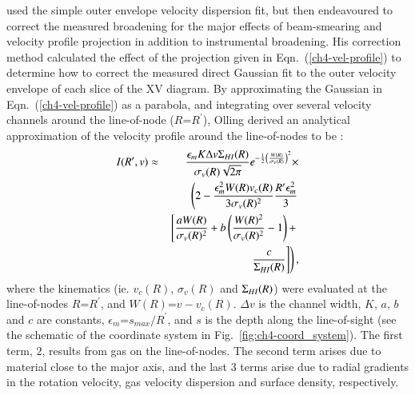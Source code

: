 \documentclass[traditabstract]{aa} %
\newcommand\HI{H{\small I}}
\begin{document}
\citet{olling1996a} used the simple outer envelope velocity dispersion
fit, but then endeavoured to correct the measured broadening for the
major effects of beam-smearing and velocity profile projection in
addition to instrumental broadening. His correction method
\citep[detailed in Appendix A of ][]{olling1996a} calculated the
effect of the projection given in Eqn.~(\ref{ch4-vel-profile}) to
determine how to correct the measured direct Gaussian fit to the outer
velocity envelope of each slice of the XV diagram. By approximating the
Gaussian in Eqn.~(\ref{ch4-vel-profile}) as a parabola, and integrating
over several velocity channels around the line-of-node
($R$=$R^{\prime}$), Olling derived an analytical approximation of the
velocity profile around the line-of-nodes to be \citep[Eqn.~(A5) of
][]{olling1996a}:
\begin{eqnarray}
\label{eq:ch4-olling-approx}
  I(R^{\prime},v) &\approx & \frac{\epsilon_m K \Delta v
      \Sigma_{\HI}(R)}{\sigma_v(R) \sqrt{2 \pi}}  e^{-
    \frac{1}{2} \left(
      \frac{W(R)}{\sigma_v(R)} \right)^2} \times \nonumber \\
 & & \left( 2 - \frac{\epsilon_m^2 W(R) v_c(R)}{3
        \sigma_v(R)^2}
    \frac{R^{\prime} \epsilon_m^2}{3} \right. \nonumber \\
 & & \left. \left[ \frac{a
          W(R)}{\sigma_v(R)^2} 
        + b \left( \frac{W(R)^2}{\sigma_v(R)^2} - 1 \right) +
\right. \right. \nonumber \\
 & & \left. \left. 
      \frac{c}{\Sigma_{\HI}(R)} \right] \right),
\end{eqnarray}
where the kinematics (ie. $v_c(R)$, $\sigma_v(R)$ and
$\Sigma_{\HI}(R)$) were evaluated at the line-of-nodes $R$=$R^{\prime}$,
and $W(R)$=$v - v_c(R)$. $\Delta v$ is the channel width, $K$, $a$,
$b$ and $c$ are constants, $\epsilon_m$=$s_{max}/R^{\prime}$,
and $s$ is the depth along the line-of-sight (see the schematic of
the coordinate system in Fig.~\ref{fig:ch4-coord_system}). The first
term, $2$, results from gas on the line-of-nodes. The second term arises
due to material close to the major axis, and the last 3 terms arise
due to radial gradients in the rotation velocity, gas velocity
dispersion and surface density, respectively.
\end{document}
